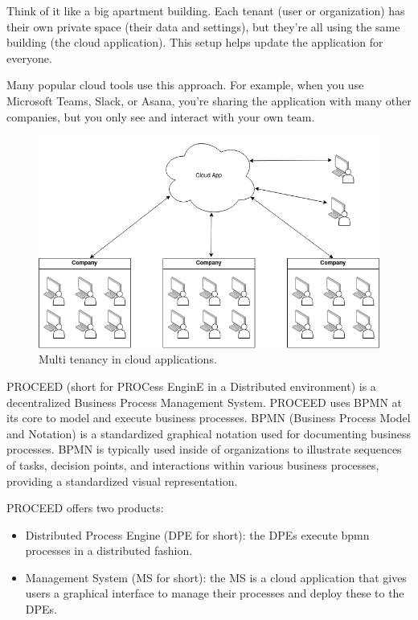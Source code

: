 Think of it like a big apartment building. Each tenant (user or organization) has their
own private space (their data and settings), but they're all using the same building (the
cloud application). This setup helps update the application for everyone.

Many popular cloud tools use this approach. For example, when you use Microsoft Teams,
Slack, or Asana, you're sharing the application with many other companies, but you only
see and interact with your own team.

\begin{figure}[H]
    \centering
    \includegraphics[scale=0.45]{images/mt-cloud-services.png}
    \caption{Multi tenancy in cloud applications.}
    \label{fig:multi-tenant=cloud-applications}
\end{figure}

PROCEED (short for PROCess EnginE in a Distributed environment) %
is a decentralized Business Process Management System.
PROCEED uses BPMN at its core to model and execute business processes.
BPMN (Business Process Model and Notation) is a standardized graphical notation used for documenting business processes.
BPMN is typically used inside of organizations to illustrate sequences of tasks,
decision points, and interactions within various business processes, providing a standardized visual representation.

PROCEED offers two products:
\begin{itemize}
    \item Distributed Process Engine (DPE for short): the DPEs execute bpmn processes in a distributed fashion.
    \item Management System (MS for short): the MS is a cloud application that gives users a graphical interface to manage their processes and deploy these to the DPEs.
\end{itemize}

